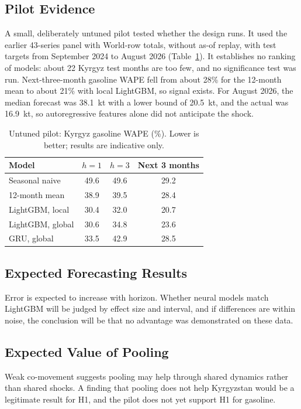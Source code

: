 \documentclass[conference]{IEEEtran}
\begin{document}
\subsection{Pilot Evidence}
A small, deliberately untuned pilot tested whether the design runs. It used the earlier 43-series panel with World-row totals, without as-of replay, with test targets from September 2024 to August 2026 (Table~\ref{tab:pilot}). It establishes no ranking of models: about 22 Kyrgyz test months are too few, and no significance test was run. Next-three-month gasoline WAPE fell from about 28\% for the 12-month mean to about 21\% with local LightGBM, so signal exists. For August 2026, the median forecast was 38.1~kt with a lower bound of 20.5~kt, and the actual was 16.9~kt, so autoregressive features alone did not anticipate the shock.

\begin{table}[t]
\centering
\caption{Untuned pilot: Kyrgyz gasoline WAPE (\%). Lower is better; results are indicative only.}
\label{tab:pilot}
\small
\begin{tabular}{@{}lccc@{}}
\toprule
Model & $h=1$ & $h=3$ & Next 3 months\\
\midrule
Seasonal naive & 49.6 & 49.6 & 29.2\\
12-month mean & 38.9 & 39.5 & 28.4\\
LightGBM, local & 30.4 & 32.0 & 20.7\\
LightGBM, global & 30.6 & 34.8 & 23.6\\
GRU, global & 33.5 & 42.9 & 28.5\\
\bottomrule
\end{tabular}
\end{table}

\subsection{Expected Forecasting Results}
Error is expected to increase with horizon. Whether neural models match LightGBM will be judged by effect size and interval, and if differences are within noise, the conclusion will be that no advantage was demonstrated on these data.

\subsection{Expected Value of Pooling}
Weak co-movement suggests pooling may help through shared dynamics rather than shared shocks. A finding that pooling does not help Kyrgyzstan would be a legitimate result for H1, and the pilot does not yet support H1 for gasoline.
\end{document}
